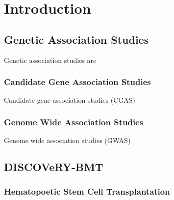 \documentclass[]{DissertateUSU}
\begin{document}
\newpage

 \fancyhead[R]{\thepage} \fancyfoot[C]{}
\listoftables

\newpage

 \fancyhead[R]{\thepage} \fancyfoot[C]{}
\listoffigures

\newpage


\newpage

\pagestyle{plain} \fancyhead[L]{} \fancyhead[R]{}
\fancyfoot[C]{\thepage} \chapter{Introduction}

\doublespacing

\section{Genetic Association Studies}\label{genetic-association-studies}

Genetic association studies are

\subsection{Candidate Gene Association
Studies}\label{candidate-gene-association-studies}

Candidate gene association studies (CGAS)

\subsection{Genome Wide Association
Studies}\label{genome-wide-association-studies}

Genome wide association studies (GWAS)

\section{DISCOVeRY-BMT}\label{discovery-bmt}

\subsection{Hematopoetic Stem Cell
Transplantation}\label{hematopoetic-stem-cell-transplantation}
\end{document}
